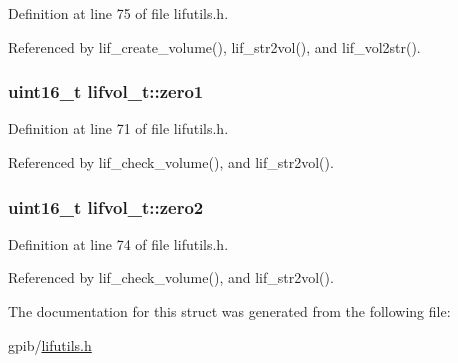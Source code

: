 Definition at line 75 of file lifutils.\+h.



Referenced by lif\+\_\+create\+\_\+volume(), lif\+\_\+str2vol(), and lif\+\_\+vol2str().

\subsubsection[{\texorpdfstring{zero1}{zero1}}]{\setlength{\rightskip}{0pt plus 5cm}uint16\+\_\+t lifvol\+\_\+t\+::zero1}\hypertarget{structlifvol__t_a5e749ae4bff79deaa813966cff04f431}{}\label{structlifvol__t_a5e749ae4bff79deaa813966cff04f431}


Definition at line 71 of file lifutils.\+h.



Referenced by lif\+\_\+check\+\_\+volume(), and lif\+\_\+str2vol().

\subsubsection[{\texorpdfstring{zero2}{zero2}}]{\setlength{\rightskip}{0pt plus 5cm}uint16\+\_\+t lifvol\+\_\+t\+::zero2}\hypertarget{structlifvol__t_ac05fef8e2c908110de7083d7afbfdb37}{}\label{structlifvol__t_ac05fef8e2c908110de7083d7afbfdb37}


Definition at line 74 of file lifutils.\+h.



Referenced by lif\+\_\+check\+\_\+volume(), and lif\+\_\+str2vol().



The documentation for this struct was generated from the following file\+:\begin{DoxyCompactItemize}
\item 
gpib/\hyperlink{lifutils_8h}{lifutils.\+h}\end{DoxyCompactItemize}
